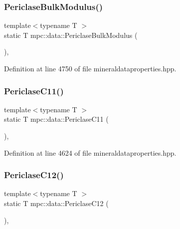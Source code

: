 \subsubsection{\texorpdfstring{Periclase\+Bulk\+Modulus()}{PericlaseBulkModulus()}}
{\footnotesize\ttfamily template$<$typename T $>$ \\
static T mpc\+::data\+::\+Periclase\+Bulk\+Modulus (\begin{DoxyParamCaption}{ }\end{DoxyParamCaption})\hspace{0.3cm}{\ttfamily [inline]}, {\ttfamily [static]}}



Definition at line 4750 of file mineraldataproperties.\+hpp.

\mbox{\label{namespacempc_1_1data_af7a6e22c741b17ba5ead3c591e5304d8}} 
\subsubsection{\texorpdfstring{Periclase\+C11()}{PericlaseC11()}}
{\footnotesize\ttfamily template$<$typename T $>$ \\
static T mpc\+::data\+::\+Periclase\+C11 (\begin{DoxyParamCaption}{ }\end{DoxyParamCaption})\hspace{0.3cm}{\ttfamily [inline]}, {\ttfamily [static]}}



Definition at line 4624 of file mineraldataproperties.\+hpp.

\mbox{\label{namespacempc_1_1data_a163543d6ec6bc201a6b2ef94dd1c397d}} 
\subsubsection{\texorpdfstring{Periclase\+C12()}{PericlaseC12()}}
{\footnotesize\ttfamily template$<$typename T $>$ \\
static T mpc\+::data\+::\+Periclase\+C12 (\begin{DoxyParamCaption}{ }\end{DoxyParamCaption})\hspace{0.3cm}{\ttfamily [inline]}, {\ttfamily [static]}}




